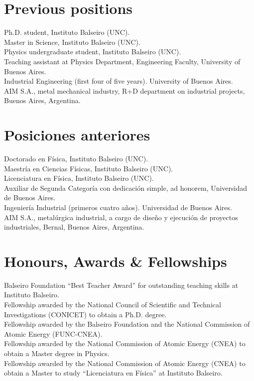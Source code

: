 \ifeng
\section*{Previous positions}
\noindent
{}Ph.D. student, Instituto Balseiro (UNC).\\
Master in Science, Instituto Balseiro (UNC).\\
Physics undergraduate student, Instituto Balseiro (UNC).\\
Teaching assistant at Physics Department, Engineering Faculty, University of Buenos Aires.\\
Industrial Engineering (first four of five years). University of Buenos Aires.\\
AIM S.A., metal mechanical industry, R+D department on industrial projects, Buenos Aires, Argentina.\\
\else
\section*{Posiciones anteriores}
\noindent
{}Doctorado en Física, Instituto Balseiro (UNC).\\
Maestría en Ciencias Físicas, Instituto Balseiro (UNC).\\
Licenciatura en Física, Instituto Balseiro (UNC).\\
Auxiliar de Segunda Categoría con dedicación simple, ad honorem, Universidad de Buenos Aires.\\
Ingeniería Industrial (primeros cuatro años). Universidad de Buenos Aires.\\
AIM S.A., metalúrgica industrial, a cargo de diseño y ejecución de proyectos industriales, Bernal, Buenos Aires, Argentina.\\
\fi

\ifeng
\section*{Honours, Awards \& Fellowships}
\noindent
{}Balseiro Foundation ``Best Teacher Award'' for outstanding teaching
skills at Instituto Balseiro.\\
Fellowship awarded by the National Council of Scientific and
Technical Investigations (CONICET) to obtain a Ph.D. degree.\\
Fellowship awarded by the Balseiro Foundation and the National
Commission of Atomic Energy (FUNC-CNEA).\\
Fellowship awarded by the National Commission of Atomic Energy
(CNEA) to obtain a Master degree in Physics.\\
Fellowship awarded by the National Commission of Atomic
Energy (CNEA) to obtain a Master to study ``Licenciatura en Física'' at
Instituto Balseiro.
\else
